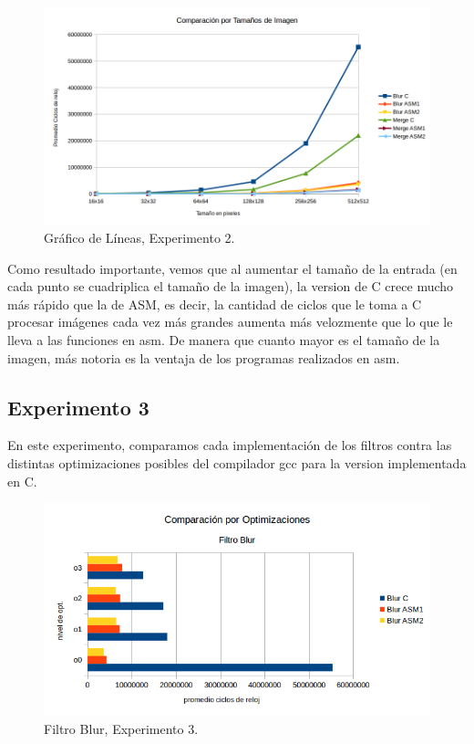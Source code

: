 \begin{figure}[ht!]
\centering
\includegraphics[width=150mm]{imagenes/resultados/graficotamanio.png}
\caption{Gráfico de Líneas, Experimento 2.}
\end{figure}

Como resultado importante, vemos que al aumentar el tamaño de la entrada (en cada punto se cuadriplica el tamaño de la imagen), la version de C crece mucho más rápido que la de ASM, es decir, la cantidad de ciclos que le toma a C procesar imágenes cada vez más grandes aumenta más velozmente que lo que le lleva a las funciones en asm. De manera que cuanto mayor es el tamaño de la imagen, más notoria es la ventaja de los programas realizados en asm. 


\subsection{Experimento 3}

En este experimento, comparamos cada implementación de los filtros contra las distintas optimizaciones posibles del compilador gcc para la version implementada en C.

\begin{figure}[ht!]
\centering
\includegraphics[width=125mm]{imagenes/resultados/grafico-opt-blur.png}
\caption{Filtro Blur, Experimento 3.}
\end{figure}

